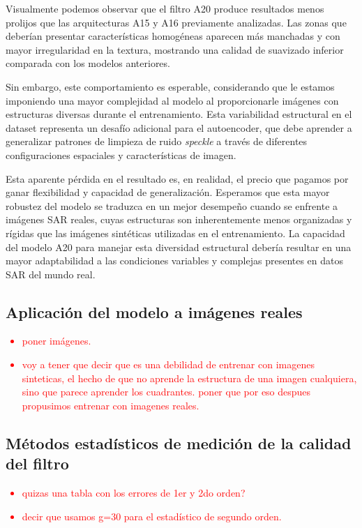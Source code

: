 Visualmente podemos observar que el filtro A20 produce resultados menos prolijos que las arquitecturas A15 y A16 previamente analizadas. Las zonas que deberían presentar características homogéneas aparecen más manchadas y con mayor irregularidad en la textura, mostrando una calidad de suavizado inferior comparada con los modelos anteriores.

Sin embargo, este comportamiento es esperable, considerando que le estamos imponiendo una mayor complejidad al modelo al proporcionarle imágenes con estructuras diversas durante el entrenamiento. Esta variabilidad estructural en el dataset representa un desafío adicional para el autoencoder, que debe aprender a generalizar patrones de limpieza de ruido \emph{speckle} a través de diferentes configuraciones espaciales y características de imagen.

Esta aparente pérdida en el resultado es, en realidad, el precio que pagamos por ganar flexibilidad y capacidad de generalización. Esperamos que esta mayor robustez del modelo se traduzca en un mejor desempeño cuando se enfrente a imágenes SAR reales, cuyas estructuras son inherentemente menos organizadas y rígidas que las imágenes sintéticas utilizadas en el entrenamiento. La capacidad del modelo A20 para manejar esta diversidad estructural debería resultar en una mayor adaptabilidad a las condiciones variables y complejas presentes en datos SAR del mundo real.

\subsection{Aplicación del modelo a imágenes reales}

\textcolor{red}{
\begin{itemize}
    \item poner imágenes.
    \item voy a tener que decir que es una debilidad de entrenar con imagenes sinteticas, el hecho de que no aprende la estructura de una imagen cualquiera, sino que parece aprender los cuadrantes. poner que por eso despues propusimos entrenar con imagenes reales.
\end{itemize}
}

\subsection{Métodos estadísticos de medición de la calidad del filtro}

\textcolor{red}{
\begin{itemize}
    \item quizas una tabla con los errores de 1er y 2do orden?
    \item decir que usamos g=30 para el estadístico de segundo orden.
\end{itemize}
}

